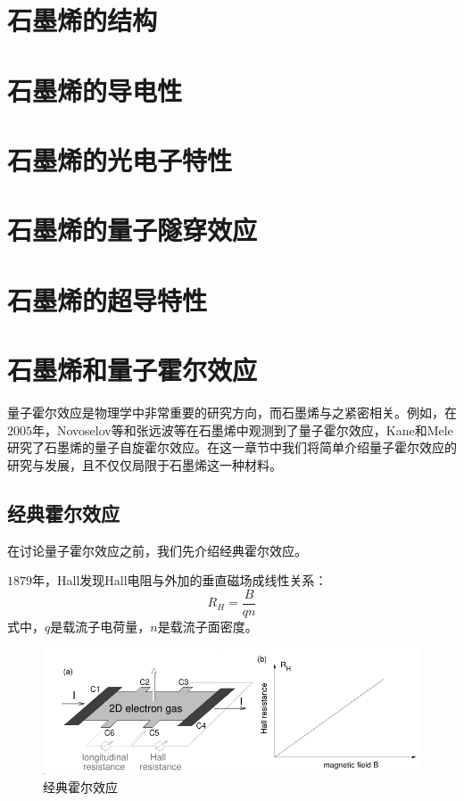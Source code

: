 \section{石墨烯的结构}

\section{石墨烯的导电性}

\section{石墨烯的光电子特性}

\section{石墨烯的量子隧穿效应}

\section{石墨烯的超导特性}

\section{石墨烯和量子霍尔效应}

量子霍尔效应是物理学中非常重要的研究方向，而石墨烯与之紧密相关。例如，在$2005$年，Novoselov等\cite{Novoselov2005}和张远波等\cite{Zhang2005}在石墨烯中观测到了量子霍尔效应，Kane和Mele研究了石墨烯的量子自旋霍尔效应\cite{Kane2005}。在这一章节中我们将简单介绍量子霍尔效应的研究与发展，且不仅仅局限于石墨烯这一种材料。

\subsection{经典霍尔效应}

在讨论量子霍尔效应之前，我们先介绍经典霍尔效应。

$1879$年，Hall发现Hall电阻与外加的垂直磁场成线性关系\cite{Hall1879}：
\begin{equation}
    R_H=\frac{B}{qn}
\end{equation}
式中，$q$是载流子电荷量，$n$是载流子面密度。

\begin{figure}
    \centering
    \includegraphics[scale=0.5]{img/Hall}
    \caption{经典霍尔效应}
\end{figure}

